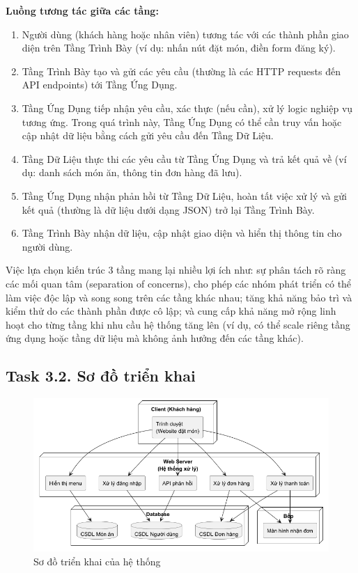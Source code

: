 \documentclass[a4paper]{article}
\begin{document}
\textbf{Luồng tương tác giữa các tầng:}
\begin{enumerate}
    \item Người dùng (khách hàng hoặc nhân viên) tương tác với các thành phần giao diện trên Tầng Trình Bày (ví dụ: nhấn nút đặt món, điền form đăng ký).
    \item Tầng Trình Bày tạo và gửi các yêu cầu (thường là các HTTP requests đến API endpoints) tới Tầng Ứng Dụng.
    \item Tầng Ứng Dụng tiếp nhận yêu cầu, xác thực (nếu cần), xử lý logic nghiệp vụ tương ứng. Trong quá trình này, Tầng Ứng Dụng có thể cần truy vấn hoặc cập nhật dữ liệu bằng cách gửi yêu cầu đến Tầng Dữ Liệu.
    \item Tầng Dữ Liệu thực thi các yêu cầu từ Tầng Ứng Dụng và trả kết quả về (ví dụ: danh sách món ăn, thông tin đơn hàng đã lưu).
    \item Tầng Ứng Dụng nhận phản hồi từ Tầng Dữ Liệu, hoàn tất việc xử lý và gửi kết quả (thường là dữ liệu dưới dạng JSON) trở lại Tầng Trình Bày.
    \item Tầng Trình Bày nhận dữ liệu, cập nhật giao diện và hiển thị thông tin cho người dùng.
\end{enumerate}

Việc lựa chọn kiến trúc 3 tầng mang lại nhiều lợi ích như: sự phân tách rõ ràng các mối quan tâm (separation of concerns), cho phép các nhóm phát triển có thể làm việc độc lập và song song trên các tầng khác nhau; tăng khả năng bảo trì và kiểm thử do các thành phần được cô lập; và cung cấp khả năng mở rộng linh hoạt cho từng tầng khi nhu cầu hệ thống tăng lên (ví dụ, có thể scale riêng tầng ứng dụng hoặc tầng dữ liệu mà không ảnh hưởng đến các tầng khác).


\subsection{Task 3.2. Sơ đồ triển khai}
    \begin{figure}[H]
        \centering
        \includegraphics[width=1.0\textwidth]{task32.png}
        \caption{Sơ đồ triển khai của hệ thống}
    \end{figure}
\end{document}
